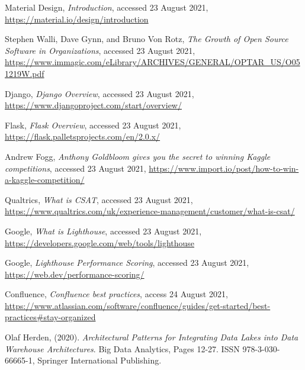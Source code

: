 \documentclass[]{UCD_CS_47360_Report}
\begin{document}
\begin{thebibliography}{99}
Material Design,  \emph{Introduction}, accessed 23 August 2021, \href{https://material.io/design/introduction}{https://material.io/design/introduction}

 Stephen Walli, Dave Gynn, and Bruno Von Rotz, \emph{The Growth of Open Source Software in Organizations}, accessed 23 August 2021, \href{https://www.immagic.com/eLibrary/ARCHIVES/GENERAL/OPTAR_US/O051219W.pdf}{https://www.immagic.com/eLibrary/ARCHIVES/GENERAL/OPTAR_US/O051219W.pdf}


 Django, \emph{Django Overview}, accessed 23 August 2021, \href{https://www.djangoproject.com/start/overview/}{https://www.djangoproject.com/start/overview/}

 Flask, \emph{Flask Overview}, accessed 23 August 2021, \href{
https://flask.palletsprojects.com/en/2.0.x/}{https://flask.palletsprojects.com/en/2.0.x/}

 Andrew Fogg, \emph{Anthony Goldbloom gives you the secret to winning Kaggle competitions}, accessed 23 August 2021, \href{https://www.import.io/post/how-to-win-a-kaggle-competition/}{https://www.import.io/post/how-to-win-a-kaggle-competition/}

 Qualtrics, \emph{What is CSAT}, accessed 23 August 2021, \href{https://www.qualtrics.com/uk/experience-management/customer/what-is-csat/}{https://www.qualtrics.com/uk/experience-management/customer/what-is-csat/}


 Google, \emph{What is Lighthouse}, accessed 23 August 2021, \href{https://developers.google.com/web/tools/lighthouse}{https://developers.google.com/web/tools/lighthouse}

 Google, \emph{Lighthouse Performance Scoring}, accessed 23 August 2021, \href{https://web.dev/performance-scoring/}{https://web.dev/performance-scoring/}

 Confluence, \emph{Confluence best practices}, access 24 August 2021, \href{https://www.atlassian.com/software/confluence/guides/get-started/best-practices\#stay-organized}{https://www.atlassian.com/software/confluence/guides/get-started/best-practices\#stay-organized}



Olaf Herden, (2020). \emph{Architectural Patterns for Integrating Data Lakes into Data Warehouse Architectures}. Big Data Analytics, Pages 12-27. ISSN 978-3-030-66665-1, Springer International Publishing.


\end{thebibliography}
\end{document}

